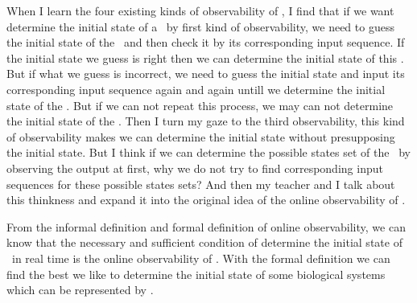 When I learn the four existing kinds of observability of \BCNs, I find that if we want determine the initial state of a \BCN\ by first kind of observability, we need to guess the initial state of the \BCN\ and then check it by its corresponding input sequence. If the initial state we guess is right then we can determine the initial state of this \BCN. But if what we guess is incorrect, we need to guess the initial state and input its corresponding input sequence again and again untill we determine the initial state of the \BCN. But if we can not repeat this process, we may can not determine the initial state of the \BCN. Then I turn my gaze to the third observability, this kind of observability makes we can determine the initial state without presupposing the initial state. But I think if we can determine the possible states set of the \BCN\ by observing the output at first, why we do not try to find corresponding input sequences for these possible states sets? And then my teacher and I talk about this thinkness and expand it into the original idea of the online observability of \BCNs. 

From the informal definition and formal definition of online observability, we can know that the necessary and sufficient condition of determine the initial state of \BCNs\ in real time is the online observability of \BCNs. With the formal definition we can find the best we like to determine the initial state of some biological systems which can be represented by \BCNs.
